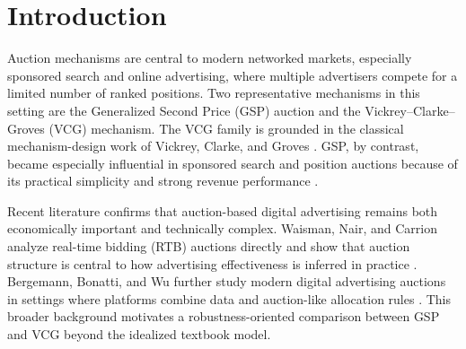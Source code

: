 \documentclass[12pt,a4paper]{article}
\begin{document}
\begin{abstract}
This project studies the robustness of two multi-slot auction mechanisms, the Generalized Second Price (GSP) auction and the Vickrey--Clarke--Groves (VCG) mechanism, under three practically relevant deviations from the ideal model: heterogeneous bidder behavior, collusion, and network latency. The simulator adopts a one-factor-at-a-time design with two reference baselines: an all-truthful market and a balanced heterogeneous market with a 1:1:1:1 type ratio. All reported experiments use 20 bidders and 5 slots. Across all experiments, GSP consistently generates higher seller revenue, whereas VCG yields lower payoff dispersion and lower utility inequality. In the collusion experiment, since VCG already tends to earn less revenue in the standard model, the key quantity is how the percentage changes with collusion intensity. The loss percentage decreases slightly from 51.88\% at 0\% collusion to 51.49\% at 40\% collusion, suggesting that VCG is relatively more resilient in the low-to-moderate collusion region, but then rises to 68.05\% at 90\% collusion, suggesting that GSP is relatively more resilient under high collusion. Although the loss changes, GSP maintains the higher absolute revenue throughout, same as the conclusion from the lecture.
\end{abstract}

\section{Introduction}

Auction mechanisms are central to modern networked markets, especially sponsored search and online advertising, where multiple advertisers compete for a limited number of ranked positions. Two representative mechanisms in this setting are the Generalized Second Price (GSP) auction and the Vickrey--Clarke--Groves (VCG) mechanism. The VCG family is grounded in the classical mechanism-design work of Vickrey, Clarke, and Groves \cite{vickrey1961,clarke1971,groves1973}. GSP, by contrast, became especially influential in sponsored search and position auctions because of its practical simplicity and strong revenue performance \cite{edelman2007,varian2007}. 

Recent literature confirms that auction-based digital advertising remains both economically important and technically complex. Waisman, Nair, and Carrion analyze real-time bidding (RTB) auctions directly and show that auction structure is central to how advertising effectiveness is inferred in practice \cite{waisman2025}. Bergemann, Bonatti, and Wu further study modern digital advertising auctions in settings where platforms combine data and auction-like allocation rules \cite{bergemann2025}. This broader background motivates a robustness-oriented comparison between GSP and VCG beyond the idealized textbook model.
\end{document}
